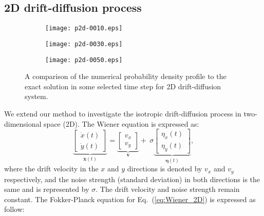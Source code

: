 \documentclass[aps,pre,reprint,superscriptaddress,showpacs,amsmath
,floatfix
]{revtex4-2}
\renewcommand{\vec}[1]{\boldsymbol{#1}}
\newcommand{\eq}[1]{Eq.~(\ref{#1})}
\begin{document}
\subsection{2D drift-diffusion process}
\begin{figure}
     \centering
     \begin{subfigure}[b]{0.4\textwidth}
         \centering
         \texttt{[image: p2d-0010.eps]}
     \end{subfigure}
     \hfill
     \begin{subfigure}[b]{0.4\textwidth}
         \centering
         \texttt{[image: p2d-0030.eps]}
     \end{subfigure}
     \hfill
     \begin{subfigure}[b]{0.4\textwidth}
         \centering
         \texttt{[image: p2d-0050.eps]}
     \end{subfigure}
        \caption{
A comparison of the numerical probability density profile to the exact solution in some selected time step for 2D drift-diffusion system.
        }
        \label{fig:p2d}
\end{figure}
We extend our method to investigate the isotropic drift-diffusion process in two-dimensional space (2D). The Wiener equation is expressed as:
\begin{equation}\label{eq:Wiener_2D}
    \underbrace{\begin{bmatrix}
    \dot{x}(t)\\ 
    \dot{y}(t)
    \end{bmatrix}}_{\dot{\vec{x}}(t)} =
    \underbrace{\begin{bmatrix}
    v_x \\ 
    v_y
    \end{bmatrix}}_{\vec{v}}  + 
    ~\sigma\underbrace{\begin{bmatrix}
    \eta_x(t)\\ 
    \eta_y(t)
    \end{bmatrix}}_{\vec{\eta}(t)} ,
\end{equation}
where the drift velocity in the $x$ and $y$ directions is denoted by $v_x$ and $v_y$ respectively, and the noise strength (standard deviation) in both directions is the same and is represented by $\sigma$. The drift velocity and noise strength remain constant. The Fokker-Planck equation for \eq{eq:Wiener_2D} is expressed as follow: 
\end{document}
